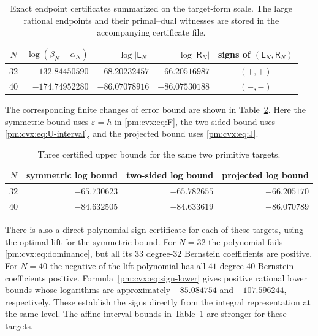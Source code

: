 \documentclass[11pt,a4paper]{article}
\theoremstyle{definition}
\theoremstyle{remark}
\numberwithin{equation}{section}
\begin{document}
\begin{table}[htbp]
\centering
\small
\begin{tabular}{c r r r c}
\hline
$N$ & $\log(\beta_N-\alpha_N)$ & $\log|\mathsf L_N|$ &
       $\log|\mathsf R_N|$ & signs of $(\mathsf L_N,\mathsf R_N)$\\
\hline
32 & $-132.84450590$ & $-68.20232457$ & $-66.20516987$ & $(+,+)$\\
40 & $-174.74952280$ & $-86.07078916$ & $-86.07530188$ & $(-,-)$\\
\hline
\end{tabular}
\caption{Exact endpoint certificates summarized on the target-form scale.
The large rational endpoints and their primal--dual witnesses are stored
in the accompanying certificate file.}
\label{pm:cvx:tab:endpoints}
\end{table}

The corresponding finite changes of error bound are shown in
Table~\ref{pm:cvx:tab:improvement}.  Here the symmetric bound uses
$\varepsilon=h$ in \eqref{pm:cvx:eq:F}, the two-sided bound uses
\eqref{pm:cvx:eq:U-interval}, and the projected bound uses
\eqref{pm:cvx:eq:J}.

\begin{table}[htbp]
\centering
\begin{tabular}{c r r r}
\hline
$N$ & symmetric log bound & two-sided log bound & projected log bound\\
\hline
32 & $-65.730623$ & $-65.782655$ & $-66.205170$\\
40 & $-84.632505$ & $-84.633619$ & $-86.070789$\\
\hline
\end{tabular}
\caption{Three certified upper bounds for the same two primitive targets.}
\label{pm:cvx:tab:improvement}
\end{table}

There is also a direct polynomial sign certificate for each of these
targets, using the optimal lift for the symmetric bound.  For $N=32$
the polynomial fails \eqref{pm:cvx:eq:dominance}, but all its $33$
degree-$32$ Bernstein coefficients are positive.  For $N=40$ the
negative of the lift polynomial has all $41$ degree-$40$ Bernstein
coefficients positive.  Formula~\eqref{pm:cvx:eq:sign-lower} gives
positive rational lower bounds whose logarithms are approximately
$-85.084754$ and $-107.596244$, respectively.  These establish the
signs directly from the integral representation at the same level.
The affine interval bounds in Table~\ref{pm:cvx:tab:endpoints} are
stronger for these targets.
\end{document}
